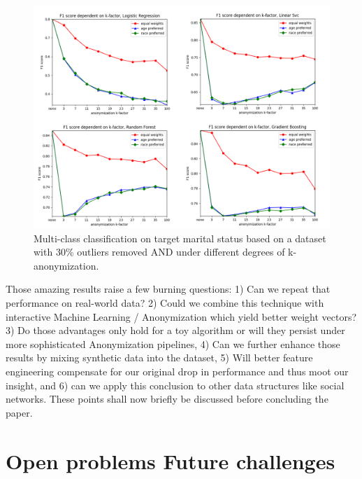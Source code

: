 \documentclass{llncs}
\begin{document}
\begin{figure}[H]
	\centering
	\includegraphics[width=1\textwidth]{figures/anon_outliers/anon_outliers_marital_combined}
	\caption{Multi-class classification on target marital status based on a dataset with 30\% outliers removed AND under different degrees of k-anonymization.}
	\label{fig:results_anonymization_outliers_marital_status}
\end{figure}

Those amazing results raise a few burning questions: 1) Can we repeat that performance on real-world data? 2) Could we combine this technique with interactive Machine Learning / Anonymization which yield better weight vectors? 3) Do those advantages only hold for a toy algorithm or will they persist under more sophisticated Anonymization pipelines, 4) Can we further enhance those results by mixing synthetic data into the dataset, 5) Will better feature engineering compensate for our original drop in performance and thus moot our insight, and 6) can we apply this conclusion to other data structures like social networks. These points shall now briefly be discussed before concluding the paper.


\section{Open problems Future challenges}
\label{sect:op_fc}

	
	
\end{document}
